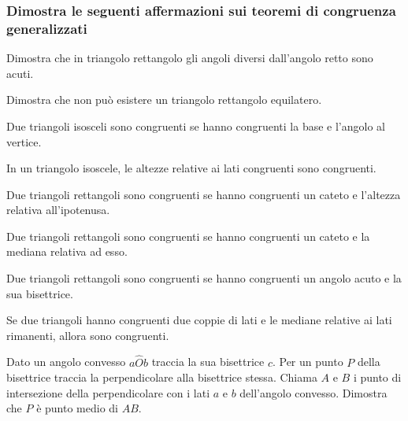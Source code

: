 \subsubsection*{Dimostra le seguenti affermazioni sui teoremi di 
congruenza generalizzati}
\begin{multicols}{2}

\begin{esercizio}
\label{ese:3.53}
Dimostra che in triangolo rettangolo gli angoli diversi dall'angolo 
retto sono acuti.
\end{esercizio}

\begin{esercizio}
\label{ese:3.54}
Dimostra che non può esistere un triangolo rettangolo equilatero.
\end{esercizio}

\begin{esercizio}
\label{ese:3.55}
Due triangoli isosceli sono congruenti se hanno congruenti la base e 
l'angolo al vertice.
\end{esercizio}

\begin{esercizio}
\label{ese:3.56}
In un triangolo isoscele, le altezze relative ai lati congruenti sono 
congruenti. 
\end{esercizio}

\begin{esercizio}
\label{ese:3.57}
Due triangoli rettangoli sono congruenti se hanno congruenti un 
cateto e l'altezza relativa all'ipotenusa.
\end{esercizio}

\begin{esercizio}
\label{ese:3.58}
Due triangoli rettangoli sono congruenti se hanno congruenti un 
cateto e la mediana relativa ad esso.
\end{esercizio}

\begin{esercizio}
\label{ese:3.59}
Due triangoli rettangoli sono congruenti se hanno congruenti un 
angolo acuto e la sua bisettrice.
\end{esercizio}

\begin{esercizio}
\label{ese:3.60}
Se due triangoli hanno congruenti due coppie di lati e le mediane 
relative ai lati rimanenti, allora sono congruenti.
\end{esercizio}

\begin{esercizio}
\label{ese:3.69}
Dato un angolo convesso $a\widehat{O}b$ traccia la sua bisettrice 
$c$. Per un punto $P$ della bisettrice traccia la perpendicolare alla 
bisettrice stessa. Chiama $A$ e $B$ i punto di intersezione della 
perpendicolare con i lati $a$ e $b$ dell'angolo convesso. Dimostra 
che $P$ è punto medio di $AB$.
\end{esercizio}


\end{multicols}
